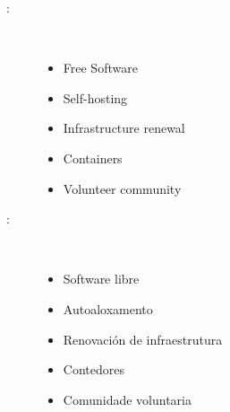 %

\begin{multicols}{2}
\begin{description}
\item [\palabraschaveprincipal:] \mbox{} \\[-20pt]
  \begin{itemize}
    \item Free Software
    \item Self-hosting
    \item Infrastructure renewal
    \item Containers
    \item Volunteer community
  \end{itemize}
\end{description}
\begin{description}
\item [\palabraschavesecundaria:] \mbox{} \\[-20pt]
  \begin{itemize}
    \item Software libre
    \item Autoaloxamento
    \item Renovaci\'on de infraestrutura
    \item Contedores
    \item Comunidade voluntaria
  \end{itemize}
\end{description}
\end{multicols}
